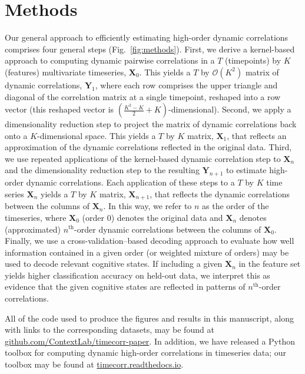 \documentclass[english]{article}
\begin{document}
\section*{Methods}
Our general approach to efficiently estimating high-order dynamic
correlations comprises four general steps (Fig.~\ref{fig:methods}).
First, we derive a kernel-based approach to computing dynamic pairwise
correlations in a $T$ (timepoints) by $K$ (features) multivariate
timeseries, $\mathbf{X}_0$.  This yields a $T$ by $\mathcal{O}(K^2)$
matrix of dynamic correlations, $\mathbf{Y}_1$, where each row
comprises the upper triangle and diagonal of the correlation matrix at a single
timepoint, reshaped into a row vector (this reshaped vector is
$\left( \frac{K^2 - K}{2} + K \right)$-dimensional).  Second, we apply a dimensionality
reduction step to project the matrix of dynamic correlations back onto
a $K$-dimensional space.  This yields a $T$ by $K$ matrix,
$\mathbf{X}_1$, that reflects an approximation of the dynamic
correlations reflected in the original data.  Third, we use repeated
applications of the kernel-based dynamic correlation step to
$\mathbf{X}_n$ and the dimensionality reduction step to the resulting
$\mathbf{Y}_{n+1}$ to estimate high-order dynamic correlations.  Each
application of these steps to a $T$ by $K$ time series $\mathbf{X}_n$
yields a $T$ by $K$ matrix, $\mathbf{X}_{n+1}$, that reflects the
dynamic correlations between the columns of $\mathbf{X}_n$.  In this
way, we refer to $n$ as the order of the timeseries, where
$\mathbf{X}_0$ (order 0) denotes the original data and $\mathbf{X}_n$
denotes (approximated) $n^\mathrm{th}$-order dynamic correlations
between the columns of $\mathbf{X}_0$.  Finally, we use a
cross-validation--based decoding approach to evaluate how well
information contained in a given order (or weighted mixture of orders)
may be used to decode relevant cognitive states.  If including a given
$\mathbf{X}_n$ in the feature set yields higher classification
accuracy on held-out data, we interpret this as evidence that the
given cognitive states are reflected in patterns of
$n^\mathrm{th}$-order correlations.

All of the code used to produce
the figures and results in this manuscript, along with links to the
corresponding datasets, may be found at
\href{https://github.com/ContextLab/timecorr-paper}{github.com/ContextLab/timecorr-paper}.
In addition, we have released a Python toolbox for computing dynamic
high-order correlations in timeseries data; our toolbox may be found
at
\href{https://timecorr.readthedocs.io/}{timecorr.readthedocs.io}.
\end{document}
